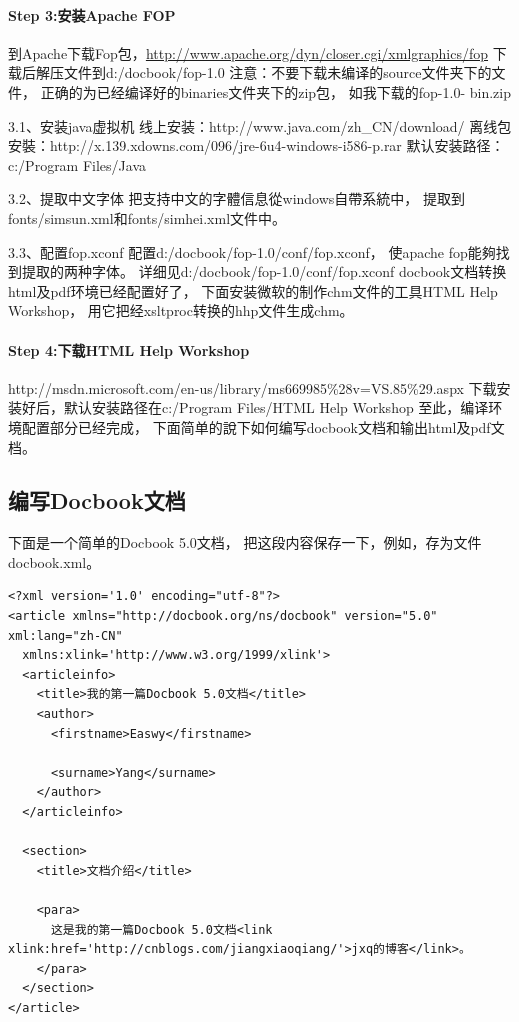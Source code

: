 \documentclass{book}
\begin{document}
\paragraph{Step 3:安装Apache FOP}

到Apache下载Fop包，\url{http://www.apache.org/dyn/closer.cgi/xmlgraphics/fop}
下载后解压文件到d:/docbook/fop-1.0
注意：不要下载未编译的source文件夹下的文件，
正确的为已经编译好的binaries文件夹下的zip包，
如我下载的fop-1.0- bin.zip


3.1、安装java虚拟机
线上安装：http://www.java.com/zh\_CN/download/
离线包安裝：http://x.139.xdowns.com/096/jre-6u4-windows-i586-p.rar
默认安装路径：c:/Program Files/Java

3.2、提取中文字体
把支持中文的字體信息從windows自帶系統中，
提取到fonts/simsun.xml和fonts/simhei.xml文件中。

3.3、配置fop.xconf
配置d:/docbook/fop-1.0/conf/fop.xconf，
使apache fop能夠找到提取的两种字体。
详细见d:/docbook/fop-1.0/conf/fop.xconf
docbook文档转换html及pdf环境已经配置好了，
下面安装微软的制作chm文件的工具HTML Help Workshop，
用它把经xsltproc转换的hhp文件生成chm。

\paragraph{Step 4:下载HTML Help Workshop}

http://msdn.microsoft.com/en-us/library/ms669985\%28v=VS.85\%29.aspx
下载安装好后，默认安装路径在c:/Program Files/HTML Help Workshop
至此，编译环境配置部分已经完成，
下面简单的說下如何编写docbook文档和输出html及pdf文档。

\subsection{编写Docbook文档}

下面是一个简单的Docbook 5.0文档，
把这段内容保存一下，例如，存为文件docbook.xml。

\begin{lstlisting}
<?xml version='1.0' encoding="utf-8"?>
<article xmlns="http://docbook.org/ns/docbook" version="5.0" xml:lang="zh-CN"
  xmlns:xlink='http://www.w3.org/1999/xlink'>
  <articleinfo>
    <title>我的第一篇Docbook 5.0文档</title>
    <author>
      <firstname>Easwy</firstname>

      <surname>Yang</surname>
    </author>
  </articleinfo> 
                  
  <section>   
    <title>文档介绍</title>

    <para>
      这是我的第一篇Docbook 5.0文档<link xlink:href='http://cnblogs.com/jiangxiaoqiang/'>jxq的博客</link>。
    </para>
  </section>
</article>
\end{lstlisting}
\end{document}

